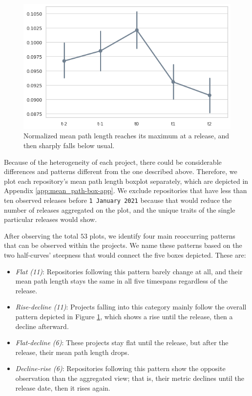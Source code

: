 \begin{figure}[!htbp]
    \centering
    \includegraphics[width=\textwidth]{figures/quantitative/pointplots/mean_path_length.png}
    \caption{Normalized mean path length reaches its maximum at a release, and then sharply falls below usual.}
    \label{fig:box-mean-path}
\end{figure}

Because of the heterogeneity of each project, there could be considerable differences and patterns different from the one described above. Therefore, we plot each repository's mean path length boxplot separately, which are depicted in Appendix \ref{app:mean_path-box-app}. We exclude repositories that have less than ten observed releases before \texttt{1 January 2021} because that would reduce the number of releases aggregated on the plot, and the unique traits of the single particular releases would show.

After observing the total $53$ plots, we identify four main reoccurring patterns that can be observed within the projects. We name these patterns based on the two half-curves' steepness that would connect the five boxes depicted. These are:

\begin{itemize}
    \item \textit{Flat (11)}: Repositories following this pattern barely change at all, and their mean path length stays the same in all five timespans regardless of the release.
    \item \textit{Rise-decline (11)}: Projects falling into this category mainly follow the overall pattern depicted in Figure \ref{fig:box-mean-path}, which shows a rise until the release, then a decline afterward.
    \item \textit{Flat-decline (6)}: These projects stay flat until the release, but after the release, their mean path length drops.
    \item \textit{Decline-rise (6)}: Repositories following this pattern show the opposite observation than the aggregated view; that is, their metric declines until the release date, then it rises again.
\end{itemize}

